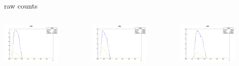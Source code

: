 \begin{frame}{raw counts}
\begin{columns}
\begin{column}[T]{0.25\textwidth}
\includegraphics[width = 0.7\textwidth]{results/yield/statistics/yield_x_Q2_z_0.50_5.500_0.40_pos.png}
\end{column}
\begin{column}[T]{0.25\textwidth}
\includegraphics[width = 0.7\textwidth]{results/yield/statistics/yield_x_Q2_z_0.50_5.500_0.40_neg.png}
\end{column}
\begin{column}[T]{0.25\textwidth}
\includegraphics[width = 0.7\textwidth]{results/yield/statistics/yield_x_Q2_z_0.50_5.500_0.50_pos.png}

\end{column}
\end{columns}
\end{frame}
